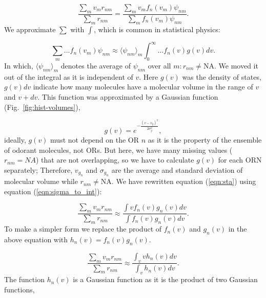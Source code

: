\documentclass[fleqn,10pt]{wlscirep} %
\begin{document}
\begin{equation}
	\frac{\displaystyle \sum_{m} v_m r_{nm}}{\displaystyle \sum_{m} r_{nm}} = \frac{\displaystyle \sum_{m} v_m f_n(v_m) \psi_{nm}}{\displaystyle \sum_{m} f_n(v_m) \psi_{nm}}.
	\label{eqn:sta}
\end{equation}
We approximate $\sum$ with $\int$, which is common in statistical physics:

\begin{equation}
	\sum_{m} \dots f_n(v_m) \psi_{nm} \approx  \langle \psi_{nm} \rangle_m \int_0^\infty \dots f_n(v) g(v)  dv. 
	\label{eqn:sigma_to_int}
\end{equation}
In which, 
$\langle \psi_{nm} \rangle_m$ denotes the average of $\psi_{nm}$ over all $m: r_{nm} \neq \text{NA}$. 
We moved it out of the integral as it is independent of $v$.
Here $g(v)$ was the density of states, $g(v) dv$ indicate how many molecules have a molecular volume in the range of $v$ and $v+dv$.
This function was approximated by a Gaussian function (Fig.~\ref{fig:hist-volumes}), 

\begin{equation}
	g(v) = e^{-\frac{(v- v_{g})^2}{2 \sigma_{g}^2}},
	\label{eqn:hist-volumes}
\end{equation}
ideally, $g(v)$ must not depend on the OR $n$ as it is the property of the ensemble of odorant molecules, not ORs. 
But here, we have many missing values ($r_{nm} = NA$) that are not overlapping, 
so we have to calculate $g(v)$ for each ORN separately; 
Therefore, $v_{g_n}$ and $\sigma_{g_n}$ are the average and standard deviation of molecular volume while $r_{nm} \neq \text{NA}$.
We have rewritten equation (\ref{eqn:sta}) using equation (\ref{eqn:sigma_to_int}):

\begin{equation}
	\frac{\displaystyle \sum_{m} v_m r_{nm}}{\displaystyle \sum_{m} r_{nm}} \approx \frac{\displaystyle \int v f_n(v) g_n(v) dv}{\displaystyle \int f_n(v) g_n(v) dv}.
	\label{eqn:sta_int}
\end{equation}
To make a simpler form we replace the product of $f_n(v)$ and $g_n(v)$ in the above equation with $h_n(v) = f_n(v) g_n(v)$.

\begin{equation}
	\frac{\displaystyle \sum_{m} v_m r_{nm}}{\displaystyle \sum_{m} r_{nm}} \approx \frac{\displaystyle \int_v v h_n(v) dv}{ \displaystyle \int_v  h_n(v) dv }.
	\label{eqn:mean}
\end{equation}
The function $h_n(v)$ is a Gaussian function as it is the product of two Gaussian functions, 
\end{document}
